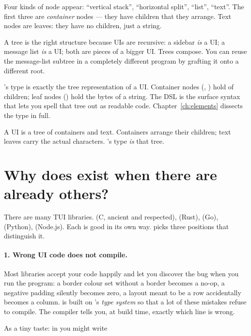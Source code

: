 Four kinds of node appear: ``vertical stack'', ``horizontal split'',
``list'', ``text''. The first three are \emph{container} nodes ---
they have children that they arrange. Text nodes are leaves: they
have no children, just a string.

A tree is the right structure because UIs are recursive: a sidebar
\emph{is} a UI; a message list \emph{is} a UI; both are pieces of a
bigger UI. Trees compose. You can reuse the message-list subtree in
a completely different program by grafting it onto a different root.

\maya{}'s  type is exactly the tree representation of
a UI. Container nodes (, ) hold
 of children; leaf nodes
() hold the bytes of a string. The DSL is the
surface syntax that lets you spell that tree out as readable \cpp{}
code. Chapter~\ref{ch:elements} dissects the  type in
full.

\begin{idea}
A UI is a tree of containers and text. Containers arrange their
children; text leaves carry the actual characters. \maya{}'s
 type \emph{is} that tree.
\end{idea}

\section{Why does \maya{} exist when there are already others?}

There are many TUI libraries.  (C, ancient and
respected),  (Rust),  (Go),
 (Python),  (Node.js). Each is good in its
own way. \maya{} picks three positions that distinguish it.

\paragraph{1. Wrong UI code does not compile.}
Most libraries accept your code happily and let you discover the bug
when you run the program: a border colour set without a border becomes
a no-op, a negative padding silently becomes zero, a layout meant to
be a row accidentally becomes a column. \maya{} is built on \cpp{}'s
\emph{type system} so that a lot of these mistakes refuse to compile.
The compiler tells you, at build time, exactly which line is wrong.

As a tiny taste: in \maya{} you might write

